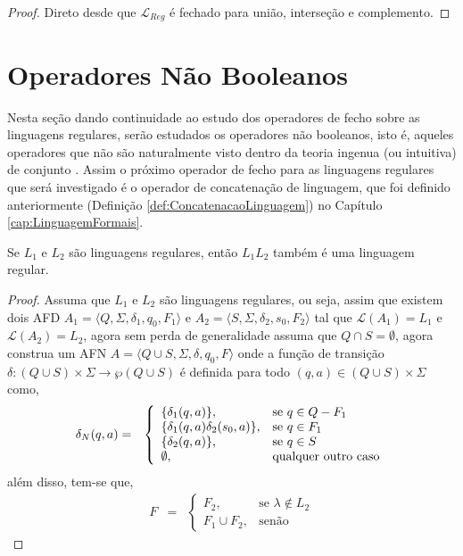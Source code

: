 \begin{proof}
	Direto desde que $\mathcal{L}_{Reg}$ é fechado para união, interseção e complemento.
\end{proof}

\section{Operadores Não Booleanos}

Nesta seção dando continuidade ao estudo dos operadores de fecho sobre as linguagens regulares, serão estudados os operadores não booleanos, isto é, aqueles operadores que não são naturalmente visto dentro da teoria ingenua (ou intuitiva) de conjunto \cite{abe1991-TC, lipschutz1978-TC}. Assim o próximo operador de fecho para as linguagens regulares que será investigado é o operador de concatenação de linguagem, que foi definido anteriormente (Definição \ref{def:ConcatenacaoLinguagem}) no Capítulo \ref{cap:LinguagemFormais}.

\begin{theorem}\label{teo:FechoConcatenacaoRegular}
	Se $L_1$ e $L_2$ são linguagens regulares, então $L_1L_2$ também é uma linguagem regular.
\end{theorem}

\begin{proof}
	Assuma que $L_1$ e $L_2$ são linguagens regulares, ou seja, assim que existem dois AFD $A_1 = \langle Q, \Sigma, \delta_1, q_0, F_1 \rangle$ e $A_2 = \langle S, \Sigma, \delta_2, s_0, F_2 \rangle$ tal que $\mathcal{L}(A_1) = L_1$ e $\mathcal{L}(A_2) = L_2$, agora sem perda de generalidade assuma que $Q \cap S = \emptyset$, agora construa um AFN $A = \langle Q \cup S, \Sigma, \delta, q_0, F\rangle$ onde a função de transição $\delta: (Q \cup S) \times \Sigma \rightarrow \wp(Q \cup S)$ é definida para todo $(q, a) \in  (Q \cup S) \times \Sigma$ como,
	\begin{eqnarray*}
		\delta_N(q, a) & = & \left\{\begin{array}{ll}	\{\delta_1(q, a)\}, & \hbox{se } q \in Q - F_1\\	\{\delta_1(q, a)\delta_2(s_0, a)\},  & \hbox{se } q \in F_1\\ \{\delta_2(q, a)\}, &   \hbox{se } q \in S\\ \emptyset, & \hbox{qualquer outro caso} \end{array}\right.
	\end{eqnarray*}
	além disso, tem-se que,
	\begin{eqnarray*}
		F & = & \left\{\begin{array}{ll} F_2, & \text{se } \lambda \notin L_2\\ F_1 \cup F_2, & \text{senão}\end{array}\right.
	\end{eqnarray*}
\end{proof}